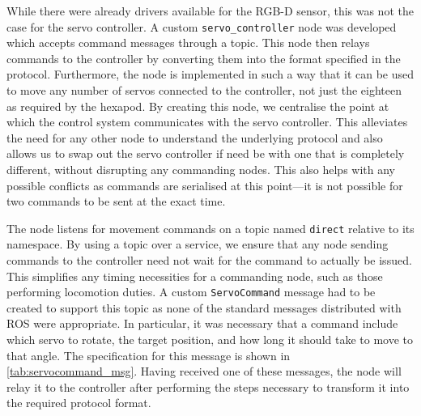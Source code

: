 While there were already drivers available for the RGB-D sensor, this was not the case for the servo controller. A custom \texttt{servo\_controller} node was developed which accepts command messages through a topic. This node then relays commands to the controller by converting them into the format specified in the protocol. Furthermore, the node is implemented in such a way that it can be used to move any number of servos connected to the controller, not just the eighteen as required by the hexapod. By creating this node, we centralise the point at which the control system communicates with the servo controller. This alleviates the need for any other node to understand the underlying protocol and also allows us to swap out the servo controller if need be with one that is completely different, without disrupting any commanding nodes. This also helps with any possible conflicts as commands are serialised at this point---it is not possible for two commands to be sent at the exact time.

The node listens for movement commands on a topic named \texttt{direct} relative to its namespace. By using a topic over a service, we ensure that any node sending commands to the controller need not wait for the command to actually be issued. This simplifies any timing necessities for a commanding node, such as those performing locomotion duties. A custom \texttt{ServoCommand} message had to be created to support this topic as none of the standard messages distributed with ROS were appropriate. In particular, it was necessary that a command include which servo to rotate, the target position, and how long it should take to move to that angle. The specification for this message is shown in \autoref{tab:servocommand_msg}. Having received one of these messages, the node will relay it to the controller after performing the steps necessary to transform it into the required protocol format.

